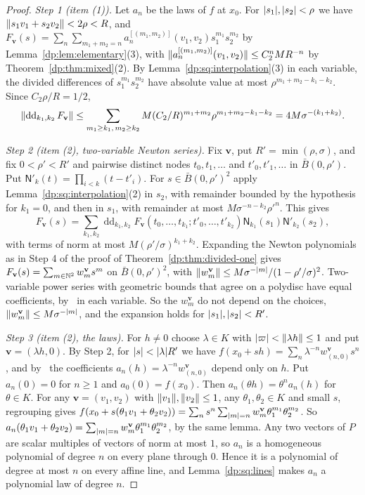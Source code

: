 \begin{proof}
\emph{Step 1 (item (1)).} Let $a_n$ be the laws of $f$ at $x_0$. For $\lvert s_1\rvert,\lvert s_2\rvert<\rho$ we have $\lVert s_1v_1+s_2v_2\rVert<2\rho<R$, and $F_{\mathbf v}(s)=\sum_n\sum_{m_1+m_2=n}a_n^{[(m_1,m_2)]}(v_1,v_2)s_1^{m_1}s_2^{m_2}$ by Lemma~\ref{dp:lem:elementary}(3), with $\lVert a_n^{[(m_1,m_2)]}(v_1,v_2)\rVert\le C_2^nMR^{-n}$ by Theorem~\ref{dp:thm:mixed}(2). By Lemma~\ref{dp:sq:interpolation}(3) in each variable, the divided differences of $s_1^{m_1}s_2^{m_2}$ have absolute value at most $\rho^{m_1+m_2-k_1-k_2}$. Since $C_2\rho/R=1/2$,
\[
 \lVert \operatorname{dd}_{k_1,k_2}F_{\mathbf v}\rVert\le\sum_{m_1\ge k_1,\,m_2\ge k_2}M(C_2/R)^{m_1+m_2}\rho^{m_1+m_2-k_1-k_2}=4M\sigma^{-(k_1+k_2)}.
\]

\emph{Step 2 (item (2), two-variable Newton series).} Fix $\mathbf v$, put $R'=\min(\rho,\sigma)$, and fix $0<\rho'<R'$ and pairwise distinct nodes $t_0,t_1,\dots$ and $t'_0,t'_1,\dots$ in $\bar B(0,\rho')$. Put $\mathsf N'_k(t)=\prod_{i<k}(t-t'_i)$. For $s\in\bar B(0,\rho')^2$ apply Lemma~\ref{dp:sq:interpolation}(2) in $s_2$, with remainder bounded by the hypothesis for $k_1=0$, and then in $s_1$, with remainder at most $M\sigma^{-n-k_2}\rho'^n$. This gives
\[
 F_{\mathbf v}(s)=\sum_{k_1,k_2}\operatorname{dd}_{k_1,k_2}F_{\mathbf v}(t_0,\dots,t_{k_1};t'_0,\dots,t'_{k_2})\mathsf N_{k_1}(s_1)\mathsf N'_{k_2}(s_2),
\]
with terms of norm at most $M(\rho'/\sigma)^{k_1+k_2}$. Expanding the Newton polynomials as in Step 4 of the proof of Theorem~\ref{dp:thm:divided-one} gives $F_{\mathbf v}(s)=\sum_{m\in\mathbb N^2}w^{\mathbf v}_ms^m$ on $\bar B(0,\rho')^2$, with $\lVert w^{\mathbf v}_m\rVert\le M\sigma^{-\lvert m\rvert}/(1-\rho'/\sigma)^2$. Two-variable power series with geometric bounds that agree on a polydisc have equal coefficients, by~\cite[Lemma~A.1]{I} in each variable. So the $w^{\mathbf v}_m$ do not depend on the choices, $\lVert w^{\mathbf v}_m\rVert\le M\sigma^{-\lvert m\rvert}$, and the expansion holds for $\lvert s_1\rvert,\lvert s_2\rvert<R'$.

\emph{Step 3 (item (2), the laws).} For $h\ne0$ choose $\lambda\in K$ with $\lvert \varpi\rvert<\lVert \lambda h\rVert\le1$ and put $\mathbf v=(\lambda h,0)$. By Step 2, for $\lvert s\rvert<\lvert \lambda\rvert R'$ we have $f(x_0+sh)=\sum_n\lambda^{-n}w^{\mathbf v}_{(n,0)}s^n$, and by~\cite[Lemma~A.1]{I} the coefficients $a_n(h)=\lambda^{-n}w^{\mathbf v}_{(n,0)}$ depend only on $h$. Put $a_n(0)=0$ for $n\ge1$ and $a_0(0)=f(x_0)$. Then $a_n(\theta h)=\theta^na_n(h)$ for $\theta\in K$. For any $\mathbf v=(v_1,v_2)$ with $\lVert v_1\rVert,\lVert v_2\rVert\le1$, any $\theta_1,\theta_2\in K$ and small $s$, regrouping gives $f(x_0+s(\theta_1v_1+\theta_2v_2))=\sum_ns^n\sum_{\lvert m\rvert=n}w^{\mathbf v}_m\theta_1^{m_1}\theta_2^{m_2}$. So $a_n(\theta_1v_1+\theta_2v_2)=\sum_{\lvert m\rvert=n}w^{\mathbf v}_m\theta_1^{m_1}\theta_2^{m_2}$, by the same lemma. Any two vectors of $P$ are scalar multiples of vectors of norm at most $1$, so $a_n$ is a homogeneous polynomial of degree $n$ on every plane through $0$. Hence it is a polynomial of degree at most $n$ on every affine line, and Lemma~\ref{dp:sq:lines} makes $a_n$ a polynomial law of degree $n$.


\end{proof}

